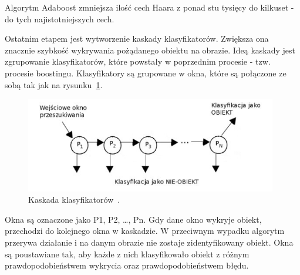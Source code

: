 \documentclass[a4paper,twoside,12pt]{book}
\begin{document}
    Algorytm Adaboost zmniejsza ilość cech Haara z ponad stu tysięcy do kilkuset - do tych najistotniejszych cech.

    Ostatnim etapem jest wytworzenie kaskady klasyfikatorów.
    Zwiększa ona znacznie szybkość wykrywania pożądanego obiektu na obrazie.
    Ideą kaskady jest zgrupowanie klasyfikatorów,
    które powstały w poprzednim procesie - tzw. procesie boostingu.
    Klasyfikatory są grupowane w okna,
    które są połączone ze sobą tak jak na rysunku~\ref{fig.kaskadaHaar}.
    \begin{figure}
        \centering
        \includegraphics[width=11cm]{Obrazy/kaskadaHaar.jpg}
        \caption{Kaskada klasyfikatorów~\cite{kaskadaHaarObraz}.}
        \label{fig.kaskadaHaar}
    \end{figure}
    Okna są oznaczone jako P1, P2, \ldots, Pn.
    Gdy dane okno wykryje obiekt, przechodzi do kolejnego okna w kaskadzie.
    W przeciwnym wypadku algorytm przerywa działanie i na danym obrazie nie zostaje zidentyfikowany obiekt.
    Okna są poustawiane tak, aby każde z nich klasyfikowało obiekt z różnym prawdopodobieństwem wykrycia oraz
    prawdopodobieństwem błędu.
\end{document}
